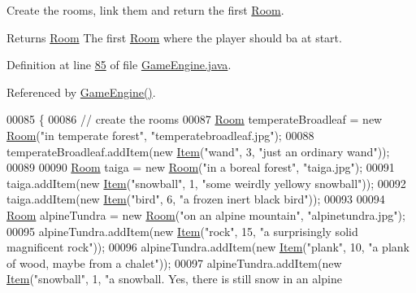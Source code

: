 Create the rooms, link them and return the first \hyperlink{classRoom}{Room}. 

\begin{DoxyReturn}{Returns}
\hyperlink{classRoom}{Room} The first \hyperlink{classRoom}{Room} where the player should ba at start. 
\end{DoxyReturn}


Definition at line \hyperlink{GameEngine_8java_source_l00085}{85} of file \hyperlink{GameEngine_8java_source}{Game\-Engine.\-java}.



Referenced by \hyperlink{GameEngine_8java_source_l00047}{Game\-Engine()}.


\begin{DoxyCode}
00085                                \{
00086         \textcolor{comment}{// create the rooms}
00087         \hyperlink{classRoom}{Room} temperateBroadleaf = \textcolor{keyword}{new} \hyperlink{classRoom}{Room}(\textcolor{stringliteral}{"in temperate forest"}, \textcolor{stringliteral}{"temperatebroadleaf.jpg"});
00088         temperateBroadleaf.addItem(\textcolor{keyword}{new} \hyperlink{classItem}{Item}(\textcolor{stringliteral}{"wand"}, 3, \textcolor{stringliteral}{"just an ordinary wand"}));
00089 
00090         \hyperlink{classRoom}{Room} taiga = \textcolor{keyword}{new} \hyperlink{classRoom}{Room}(\textcolor{stringliteral}{"in a boreal forest"}, \textcolor{stringliteral}{"taiga.jpg"});
00091         taiga.addItem(\textcolor{keyword}{new} \hyperlink{classItem}{Item}(\textcolor{stringliteral}{"snowball"}, 1, \textcolor{stringliteral}{"some weirdly yellowy snowball"}));
00092         taiga.addItem(\textcolor{keyword}{new} \hyperlink{classItem}{Item}(\textcolor{stringliteral}{"bird"}, 6, \textcolor{stringliteral}{"a frozen inert black bird"}));
00093 
00094         \hyperlink{classRoom}{Room} alpineTundra = \textcolor{keyword}{new} \hyperlink{classRoom}{Room}(\textcolor{stringliteral}{"on an alpine mountain"}, \textcolor{stringliteral}{"alpinetundra.jpg"});
00095         alpineTundra.addItem(\textcolor{keyword}{new} \hyperlink{classItem}{Item}(\textcolor{stringliteral}{"rock"}, 15, \textcolor{stringliteral}{"a surprisingly solid magnificent rock"}));
00096         alpineTundra.addItem(\textcolor{keyword}{new} \hyperlink{classItem}{Item}(\textcolor{stringliteral}{"plank"}, 10, \textcolor{stringliteral}{"a plank of wood, maybe from a chalet"}));
00097         alpineTundra.addItem(\textcolor{keyword}{new} \hyperlink{classItem}{Item}(\textcolor{stringliteral}{"snowball"}, 1, \textcolor{stringliteral}{"a snowball. Yes, there is still snow in an alpine
}
\end{DoxyCode}
